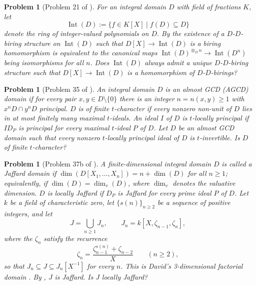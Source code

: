 \documentclass[11pt,reqno]{amsart}
\numberwithin{equation}{section}
\newtheorem{problem}[thm]{Problem}
\theoremstyle{definition}
\begin{document}
\begin{problem}[Problem 21 of \cite{CFFG2014}]\label{prob:21}
For an integral domain $D$ with field of fractions $K$, let
\[
   \operatorname{Int}(D)
   :=\{f\in K[X]\mid f(D)\subseteq D\}
\]
denote the ring of integer-valued polynomials on $D$. By
\cite{Elliott2010-Plethories} the existence of a $D$-$D$-biring structure
on $\operatorname{Int}(D)$ such that $D[X]\to\operatorname{Int}(D)$ is a
biring homomorphism is equivalent to the canonical maps
$\operatorname{Int}(D)^{\otimes_D n}\to\operatorname{Int}(D^n)$ being
isomorphisms for all $n$. Does $\operatorname{Int}(D)$ always admit a
unique $D$-$D$-biring structure such that $D[X]\to\operatorname{Int}(D)$
is a homomorphism of $D$-$D$-birings?
\end{problem}

\begin{problem}[Problem 35 of \cite{CFFG2014}]\label{prob:35}
An integral domain $D$ is an \emph{almost GCD (AGCD) domain} if for every
pair $x,y\in D\setminus\{0\}$ there is an integer $n=n(x,y)\ge 1$ with
$x^n D\cap y^n D$ principal. $D$ is of \emph{finite $t$-character} if every
nonzero non-unit of $D$ lies in at most finitely many maximal $t$-ideals.
An ideal $I$ of $D$ is \emph{$t$-locally principal} if $ID_P$ is principal
for every maximal $t$-ideal $P$ of $D$. Let $D$ be an almost GCD domain
such that every nonzero $t$-locally principal ideal of $D$ is
$t$-invertible. Is $D$ of finite $t$-character?
\end{problem}

\begin{problem}[Problem 37b of \cite{CFFG2014}]\label{prob:37b}
A finite-dimensional integral domain $D$ is called a \emph{Jaffard domain}
if $\dim(D[X_1,\dots,X_n])=n+\dim(D)$ for all $n\ge 1$; equivalently, if
$\dim(D)=\dim_v(D)$, where $\dim_v$ denotes the valuative dimension. $D$
is \emph{locally Jaffard} if $D_P$ is Jaffard for every prime ideal $P$ of
$D$. Let $k$ be a field of characteristic zero, let $\{s(n)\}_{n\ge 2}$ be
a sequence of positive integers, and let
\[
   J=\bigcup_{n\ge 1} J_n,\qquad J_n=k[X,\zeta_{n-1},\zeta_n],
\]
where the $\zeta_n$ satisfy the recurrence
\[
   \zeta_n=\frac{\zeta_{n-1}^{s(n)}+\zeta_{n-2}}{X}\qquad(n\ge 2),
\]
so that $J_n\subseteq J\subseteq J_n[X^{-1}]$ for every $n$. This is
David's 3-dimensional factorial domain \cite{David1973}. By
\cite{DobbsFontanaKabbaj1990}, $J$ is Jaffard. Is $J$ locally Jaffard?
\end{problem}


\end{document}
